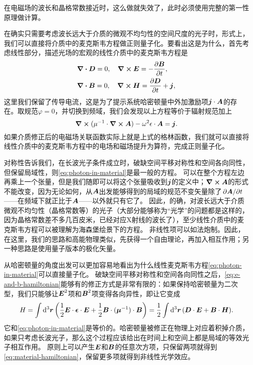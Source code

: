 在电磁场的波长和晶格常数接近时，这么做就失效了，此时必须使用完整的第一性原理做计算。

在确实只需要考虑波长远大于介质的微观不均匀性的空间尺度的光子时，形式上，我们可以直接将介质中的麦克斯韦方程做正则量子化。要看出这是为什么，首先考虑线性部分，描述光场的宏观的线性介质中的麦克斯韦方程是
\[
    \begin{aligned}
        &\div{\vb*{D}} = 0, \quad \curl{\vb*{E}} = - \pdv{\vb*{B}}{t}, \\
        &\div{\vb*{B}} = 0, \quad \curl{\vb*{H}} = \pdv{\vb*{D}}{t} + \vb*{j},
    \end{aligned}
\]
这里我们保留了传导电流，这是为了提示系统哈密顿量中外加激励项$\vb*{j} \cdot \vb*{A}$的存在。取规范$\varphi=0$，并切换到频域，我们会发现以上方程等价于辐射规范加上
\begin{equation}
    \curl{(\mu^{-1} \cdot \curl{\vb*{A}})} - \omega^2 \epsilon \cdot \vb*{A} = \vb*{j}.
    \label{eq:photon-in-material}
\end{equation}
如果介质修正后的电磁场关联函数实际上就是上式的格林函数，我们就可以直接将线性介质中的麦克斯韦方程中的电场和磁场提升为算符，完成正则量子化。

对称性告诉我们，在长波光子条件成立时，破缺空间平移对称性和空间各向同性，但保留局域性，则\eqref{eq:photon-in-material}是最一般的方程。
可以在整个方程左边再乘上一个张量，但是我们随即可以将这个张量吸收到$\vb*{j}$的定义中；$\curl{\vb*{A}}$的形式不能改变，因为无论如何，从$\vb*{A}$出发能够得到的局域的规范不变矢量除了$\pdv*{\vb*{A}}{t}$——在频域下就正比于$\vb*{A}$——以外就只有它了。
因此，的确，对波长远大于介质微观不均匀性（晶格常数等）的光子（大部分能够称为“光学”的问题都是这样的，因为晶格常数差不多几百皮米，已经对应X射线的波长了），至少线性介质中的麦克斯韦方程可以被理解为海森堡绘景下的方程。
非线性项可以如法炮制。因此，在这里，我们的思路和高能物理类似，先获得一个自由理论，再加入相互作用；另一种思路是使用量子版本的极化矢量。

从哈密顿量的角度出发可以更加容易地看出为什么线性麦克斯韦方程\eqref{eq:photon-in-material}可以直接量子化。
破缺空间平移对称性和空间各向同性之后，\eqref{eq:e-and-b-hamiltonian}能够有的修正方式是非常有限的：如果保持哈密顿量为二次型，我们只能够让$\vb*{E}^2$项和$\vb*{B}^2$项变得各向异性，即让它变成
\begin{equation}
    H = \int \dd[3]{\vb*{r}} \left( \frac{1}{2} \vb*{E} \cdot \vb*{\epsilon} \cdot \vb*{E} + \frac{1}{2} \vb*{B} \cdot (\vb*{\mu}^{-1}) \cdot \vb*{B} \right) = \frac{1}{2} \int \dd[3]{\vb*{r}} (\vb*{D} \cdot \vb*{E} + \vb*{B} \cdot \vb*{H}).
    \label{eq:material-hamiltonian}
\end{equation}
它和\eqref{eq:photon-in-material}是等价的。哈密顿量被修正在物理上对应着积掉介质，如果只考虑长波光子，那么这个过程应该给出在时间上和空间上都是局域的等效光子相互作用。
原则上可以产生$\vb*{E}$和$\vb*{B}$的任意次方项，只保留两项就得到\eqref{eq:material-hamiltonian}，保留更多项就得到非线性光学效应。

